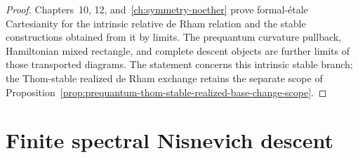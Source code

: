 \begin{proof}
Chapters~10, 12, and~\ref{ch:symmetry-noether} prove formal-\'etale Cartesianity
for the intrinsic relative de Rham relation and the stable constructions obtained
from it by limits.  The prequantum curvature pullback, Hamiltonian mixed rectangle,
and complete descent objects are further limits of those transported diagrams.
The statement concerns this intrinsic stable branch; the Thom-stable realized de
Rham exchange retains the separate scope of
Proposition~\ref{prop:prequantum-thom-stable-realized-base-change-scope}.
\end{proof}

\section{Finite spectral Nisnevich descent}
\label{sec:prequantum-finite-nisnevich-descent}

